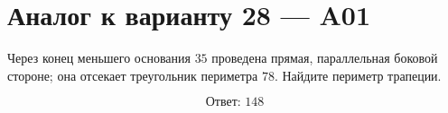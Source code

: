 


\section*{Аналог к варианту 28 — A01}
Через конец меньшего основания \(35\) проведена прямая, параллельная боковой стороне; она отсекает треугольник периметра \(78\). Найдите периметр трапеции.
\begin{center}\end{center}
\[\boxed{\text{Ответ: }148}\]

